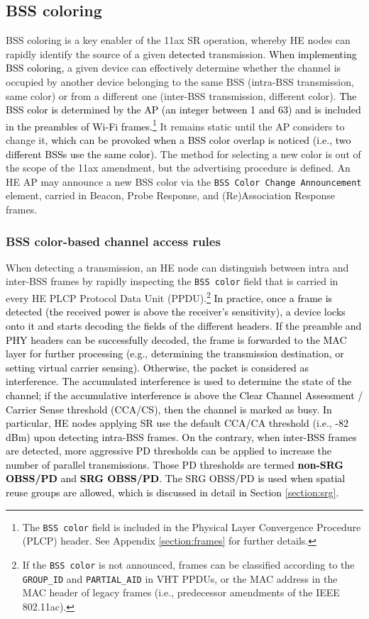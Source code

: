 \documentclass{ieeeaccess}
\begin{document}
\subsection{BSS coloring}	
\label{section:bss_coloring}	
BSS coloring is a key enabler of the 11ax SR operation, whereby HE nodes can rapidly identify the source of a given \textcolor{black}{detected} transmission. \textcolor{black}{When implementing BSS coloring,} a given device can effectively determine whether the channel is occupied by another device belonging to the same BSS (intra-BSS transmission, same color) or from a different one (inter-BSS transmission, different color). \textcolor{black}{The BSS color is determined by the AP (an integer between 1 and 63) and is included in the preambles of Wi-Fi frames.}\footnote{The \texttt{BSS color} field is included in the Physical Layer Convergence Procedure (PLCP) header. See Appendix \ref{section:frames} for further details.} It remains static until the AP considers to change it\textcolor{black}{, which can be provoked when a BSS color overlap is noticed (i.e., two different BSSs use the same color).} The method for selecting a new color is out of the scope of the 11ax amendment, but the advertising procedure is defined. An HE AP may announce a new BSS color via the \texttt{BSS Color Change Announcement} element, carried in Beacon, Probe Response, and (Re)Association Response frames. 

\subsubsection{BSS color-based channel access rules}
\label{section:bss_color_channel_access}
When detecting a transmission, an HE node can distinguish between intra and inter-BSS frames by rapidly inspecting the \texttt{BSS color} field that is carried in every HE PLCP Protocol Data Unit (PPDU).\footnote{If the \texttt{BSS color} is not announced, frames can be classified according to the \texttt{GROUP\_ID} and \texttt{PARTIAL\_AID} in VHT PPDUs, or the MAC address in the MAC header of legacy frames (i.e., predecessor amendments of the IEEE 802.11ac).} \textcolor{black}{In practice, once a frame is detected (the received power is above the receiver's sensitivity), a device locks onto it and starts decoding the fields of the different headers. If the preamble and PHY headers can be successfully decoded, the frame is forwarded to the MAC layer for further processing (e.g., determining the transmission destination, or setting virtual carrier sensing). Otherwise, the packet is considered as interference. The accumulated interference is used to determine the state of the channel; if the accumulative interference is above the Clear Channel Assessment / Carrier Sense threshold (CCA/CS), then the channel is marked as busy. In particular, HE nodes applying SR use the default CCA/CA threshold (i.e., -82 dBm) upon detecting intra-BSS frames. On the contrary, when inter-BSS frames are detected, more aggressive PD thresholds can be applied to increase the number of parallel transmissions. Those PD thresholds are termed \textbf{non-SRG OBSS/PD} and \textbf{SRG OBSS/PD}. The SRG OBSS/PD is used when spatial reuse groups are allowed, which is discussed in detail in Section \ref{section:srg}.}
\end{document}
